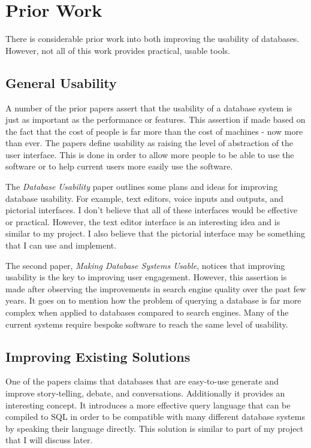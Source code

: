 \chapter{Prior Work}

There is considerable prior work into both improving the usability of databases. However, not all of this work provides practical, usable tools.

\section{General Usability}

A number of the prior papers\cite{Date, Jagadish2007} assert that the usability of a database system is just as important as the performance or features. This assertion if made based on the fact that the cost of people is far more than the cost of machines - now more than ever. The papers define usability as raising the level of abstraction of the user interface. This is done in order to allow more people to be able to use the software or to help current users more easily use the software.

The \emph{Database Usability} paper\cite{Date} outlines some plans and ideas for improving database usability. For example, text editors, voice inputs and outputs, and pictorial interfaces. I don't believe that all of these interfaces would be effective or practical. However, the text editor interface is an interesting idea and is similar to my project. I also believe that the pictorial interface may be something that I can use and implement.

The second paper, \emph{Making Database Systems Usable}, notices that improving usability is the key to improving user engagement. However, this assertion is made after observing the improvements in search engine quality over the past few years. It goes on to mention how the problem of querying a database is far more complex when applied to databases compared to search engines. Many of the current systems require bespoke software to reach the same level of usability.

\section{Improving Existing Solutions}

One of the papers\cite{Stolte2010} claims that databases that are easy-to-use generate and improve story-telling, debate, and conversations. Additionally it provides an interesting concept. It introduces a more effective query language that can be compiled to SQL in order to be compatible with many different database systems by speaking their language directly. This solution is similar to part of my project that I will discuss later.

